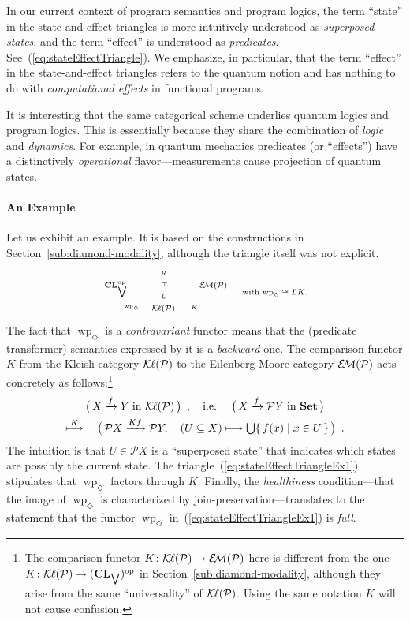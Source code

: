 \documentclass[9pt, preprint]{sigplanconf}
\theoremstyle{theorem}
\theoremstyle{definition}
\newcommand{\pow}{\mathcal{P}}
\newcommand{\op}{\mathrm{op}}
\newcommand{\Set}{\mathbf{Set}}
\newcommand{\Sets}{\Set}
\newcommand{\CL}{\mathbf{CL}}
\newcommand{\EM}{\mathcal{E}{\kern-.5ex}\mathcal{M}}
\newcommand{\Kl}{\mathcal{K}{\kern-.2ex}\ell}
\newcommand{\wpre}{\mathop{\mathrm{wp}}\nolimits}
\begin{document}
In our current context of program semantics and program logics,
the term ``state'' in the state-and-effect triangles is more intuitively
understood as \emph{superposed states}, and the term ``effect'' is
understood as \emph{predicates}. See~(\ref{eq:stateEffectTriangle}). We
emphasize, in particular, that the term ``effect'' in the
state-and-effect triangles refers to the quantum notion and has nothing to do with \emph{computational
effects} in functional programs.

It is interesting that the same categorical scheme underlies quantum
logics and program logics. This is essentially because they share the
combination of \emph{logic} and \emph{dynamics}. For example, in quantum mechanics
predicates (or ``effects'') have a distinctively \emph{operational}
flavor---measurements cause projection of quantum states.

\paragraph{An Example}
Let us exhibit an example. It is based on the constructions in
Section~\ref{sub:diamond-modality}, although the triangle itself was not explicit.
\begin{equation}\label{eq:stateEffectTriangleEx1}
 \scriptsize
  \vcenter{\xymatrix@R-2.5em@C-1em{
 {\CL_{\bigvee}^{\op}}
 \ar@/^/[rr]^-{R}
 \ar@{}[rr]|{\top}
  &&
  {\EM({\pow})}
 \ar@/^/[ll]^-{L}
 \\
 &
  \Kl(\pow)
\ar@/^/[ul]^{\wpre_{\Diamond}} \ar@/_/[ur]_{K}
  }}
  \quad\text{ with $\wpre_{\Diamond}\cong LK$.}
\end{equation}
The fact that $\wpre_{\Diamond}$ is a \emph{contravariant} functor
means that the (predicate transformer) semantics expressed by it is a
\emph{backward} one.
The comparison functor $K$ from the Kleisli category
$\Kl{(\pow)}$
to the Eilenberg-Moore category $\EM(\pow)$ acts concretely as
follows:\footnote{The comparison functor $K\colon \Kl(\pow)\to\EM(\pow)$
here is different from the one $K\colon \Kl(\pow)\to
(\CL_{\bigvee})^{\op}$ in Section~\ref{sub:diamond-modality}, although
they arise from the same ``universality'' of $\Kl(\pow)$. Using the same
notation $K$ will not cause confusion.
}
\begin{multline*}
 \bigl(\,
  X\xrightarrow{f}Y\;\text{in $\Kl(\pow)$}
\,\bigr)\enspace,
 \quad\text{i.e.\ } \quad
 \bigl(\,
 X\xrightarrow{f}\pow Y\;\text{in $\Sets$}
\,\bigr)
 \\
 \stackrel{K}{\longmapsto}
 \quad
 \bigl(\,
  \pow X\xrightarrow{Kf}\pow Y, \quad
  (U\subseteq X) \longmapsto\textstyle \bigcup \{\,f(x)\mid x\in U\,\}
\,\bigr)\enspace.
\end{multline*}
The intuition is that $U\in \pow X$ is a ``superposed
state'' that indicates which states  are possibly the current
state. The triangle~(\ref{eq:stateEffectTriangleEx1}) stipulates that
$\wpre_{\Diamond}$ factors through $K$. Finally, the \emph{healthiness}
condition---that the image of $\wpre_{\Diamond}$ is characterized by
join-preservation---translates to the statement that the functor $\wpre_{\Diamond}$
in~(\ref{eq:stateEffectTriangleEx1}) is \emph{full}.
\end{document}
